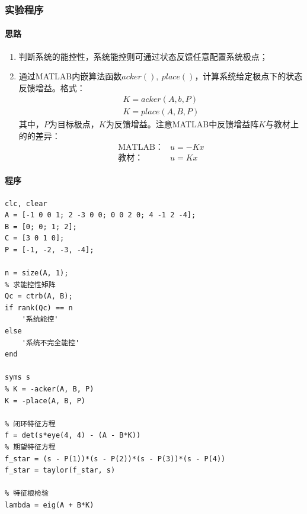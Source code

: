 \documentclass[UTF8]{article}
\begin{document}
\subsubsection{实验程序}

\paragraph{思路}

\begin{enumerate}
    \item 判断系统的能控性，系统能控则可通过状态反馈任意配置系统极点；
    \item 通过MATLAB内嵌算法函数$acker(),\ place()$，计算系统给定极点下的状态反馈增益。格式：
\begin{align*}
    K = acker(A, b, P) \\
    K = place(A, B, P)
\end{align*}
其中，$P$为目标极点，$K$为反馈增益。注意MATLAB中反馈增益阵$K$与教材上的的差异：
$$
\begin{aligned}
    \text{MATLAB：}& u = -Kx \\
    \text{教材：}& u = Kx
\end{aligned}
$$
\end{enumerate}

\paragraph{程序}
\begin{lstlisting}
clc, clear
A = [-1 0 0 1; 2 -3 0 0; 0 0 2 0; 4 -1 2 -4];
B = [0; 0; 1; 2];
C = [3 0 1 0];
P = [-1, -2, -3, -4];

n = size(A, 1);
% 求能控性矩阵
Qc = ctrb(A, B);
if rank(Qc) == n
    '系统能控'
else
    '系统不完全能控'
end

syms s
% K = -acker(A, B, P)
K = -place(A, B, P)

% 闭环特征方程
f = det(s*eye(4, 4) - (A - B*K))
% 期望特征方程
f_star = (s - P(1))*(s - P(2))*(s - P(3))*(s - P(4))
f_star = taylor(f_star, s)

% 特征根检验
lambda = eig(A + B*K)
\end{lstlisting}
\end{document}

